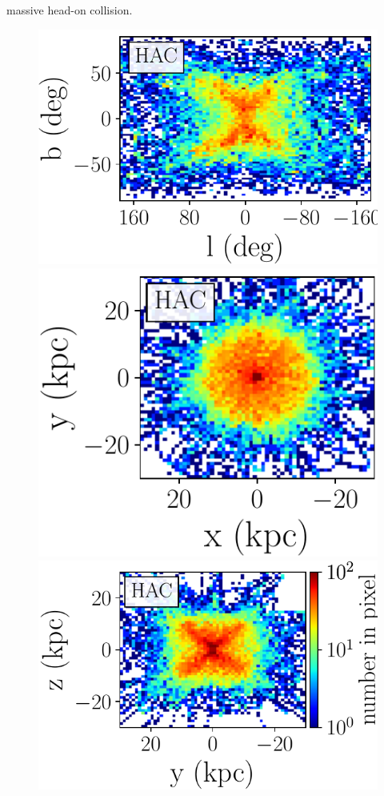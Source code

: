\documentclass[a4paper,useAMS,usenatbib]{mnras}
\begin{document}
massive head-on collision.
%
%
\begin{figure}
	     \includegraphics[scale=0.302]{HAC_orbits_8Gyrs_lb_defaultmass.pdf}
             \includegraphics[scale=0.302]{HAC_orbits_8Gyrs_xy_defaultmass.pdf}
             \includegraphics[scale=0.302]{HAC_orbits_8Gyrs_yz_defaultmass.pdf}

\end{figure}
\end{document}
